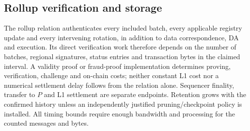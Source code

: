 \subsection{Rollup verification and storage}
The rollup relation authenticates every included batch, every applicable
registry update and every intervening rotation, in addition to data
correspondence, DA and execution. Its direct verification work therefore
depends on the number of batches, regional signatures, status entries and
transaction bytes in the claimed interval. A validity proof or fraud-proof
implementation determines proving, verification, challenge and on-chain
costs; neither constant L1 cost nor a numerical settlement delay follows
from the relation alone. Sequencer finality, transfer to $P$ and L1
settlement are separate endpoints. Retention grows with the confirmed
history unless an independently justified pruning/checkpoint policy is
installed. All timing bounds require enough bandwidth and processing for
the counted messages and bytes.
